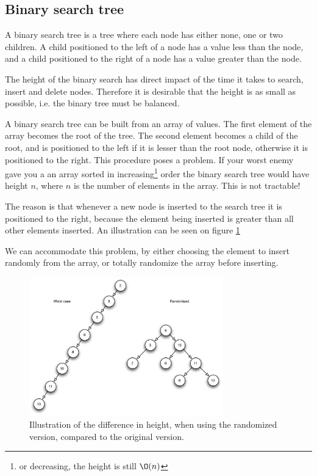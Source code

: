\documentclass[10pt]{article}
\begin{document}


\subsection{Binary search tree} %
\label{sub:binary_search_tree}
A binary search tree is a tree where each node has either none, one or two children. A child positioned to the left of a node has a value less than the node, and a child positioned to the right of a node has a value greater than the node.

The height of the binary search has direct impact of the time it takes to search, insert and delete nodes. Therefore it is desirable that the height is as small as possible, i.e. the binary tree must be balanced.

A binary search tree can be built from an array of values. The first element of the array becomes the root of the tree. The second element becomes a child of the root, and is positioned to the left if it is lesser than the root node, otherwise it is positioned to the right. This procedure poses a problem. If your worst enemy gave you a an array sorted in increasing\footnote{or decreasing, the height is still $\O(n)$} order the binary search tree would have height $n$, where $n$ is the number of elements in the array. This is not tractable! 

The reason is that whenever a new node is inserted to the search tree it is positioned to the right, because the element being inserted is greater than all other elements inserted. An illustration can be seen on figure \ref{fig11}

We can accommodate this problem, by either choosing the element to insert randomly from the array, or totally randomize the array before inserting.

\begin{figure}[ht]
\centering
\includegraphics[width=0.75\textwidth]{figures/fig11.pdf}
\caption{Illustration of the difference in height, when using the randomized version, compared to the original version.}
\label{fig11}
\end{figure}
\end{document}
